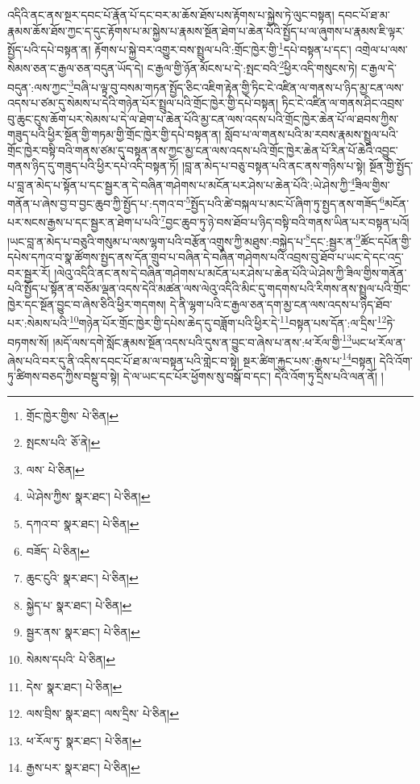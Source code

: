 འདིའི་ནང་ནས་སྔར་དབང་པོ་རྣོན་པོ་དང་བར་མ་ཆོས་ཐོས་པས་རྟོགས་པ་སྐྱེས་ཏེ་ལུང་བསྟན། དབང་པོ་ཐ་མ་རྣམས་ཆོས་ཐོས་ཀྱང་ད་དུང་རྟོགས་པ་མ་སྐྱེས་པ་རྣམས་སྔོན་ཐེག་པ་ཆེན་པོའི་སྤྱོད་པ་ལ་ཞུགས་པ་རྣམས་ཇི་ལྟར་སྤྱོད་པའི་དཔེ་བསྟན་ན། རྟོགས་པ་སྐྱེ་བར་འགྱུར་བས་སྤྲུལ་པའི་:གྲོང་ཁྱེར་གྱི་\footnote{གྲོང་ཁྱེར་གྱིས་  པེ་ཅིན། }དཔེ་བསྟན་པ་དང་། འགྲེལ་པ་ལས་སེམས་ཅན་ང་རྒྱལ་ཅན་བདུན་ཡོད་དེ། ང་རྒྱལ་གྱི་ཉོན་མོངས་པ་དེ་:སྤང་བའི་\footnote{སྤངས་པའི་  ཅོ་ནེ། }ཕྱིར་འདི་གསུངས་ཏེ། ང་རྒྱལ་དེ་བདུན་:ལས་ཀྱང་\footnote{ལས་  པེ་ཅིན། }བཞི་པ་ལྟ་བུ་བསམ་གཏན་སྤྱོད་ཅིང་འཇིག་རྟེན་གྱི་ཏིང་ངེ་འཛིན་ལ་གནས་པ་ཉིད་མྱ་ངན་ལས་འདས་པ་ཙམ་དུ་སེམས་པ་དེའི་གཉེན་པོར་སྤྲུལ་པའི་གྲོང་ཁྱེར་གྱི་དཔེ་བསྟན། ཏིང་ངེ་འཛིན་ལ་གནས་ཤིང་འབྲས་བུ་ཆུང་ངུས་ཆོག་པར་སེམས་པ་དེ་ལ་ཐེག་པ་ཆེན་པོའི་མྱ་ངན་ལས་འདས་པའི་གྲོང་ཁྱེར་ཆེན་པོ་ལ་ཐབས་ཀྱིས་གཟུད་པའི་ཕྱིར་སྔོན་གྱི་གཏམ་གྱི་གྲོང་ཁྱེར་གྱི་དཔེ་བསྟན་ན། སློབ་པ་ལ་གནས་པའི་མ་རབས་རྣམས་སྤྲུལ་པའི་གྲོང་ཁྱེར་བསྟི་བའི་གནས་ཙམ་དུ་བསྟན་ནས་ཀྱང་མྱ་ངན་ལས་འདས་པའི་གྲོང་ཁྱེར་ཆེན་པོ་རིན་པོ་ཆེའི་འབྱུང་གནས་ཉིད་དུ་གཟུད་པའི་ཕྱིར་དཔེ་འདི་བསྟན་ཏོ། །བླ་ན་མེད་པ་བཅུ་བསྟན་པའི་ནང་ནས་གཉིས་པ་སྟེ། སྔོན་གྱི་སྤྱོད་པ་བླ་ན་མེད་པ་སྟོན་པ་དང་སྦྱར་ན་དེ་བཞིན་གཤེགས་པ་མངོན་པར་ཤེས་པ་ཆེན་པོའི་:ཡེ་ཤེས་ཀྱི་\footnote{ཡེ་ཤེས་ཀྱིས་  སྣར་ཐང་།  པེ་ཅིན། }ཟིལ་གྱིས་གནོན་པ་ཞེས་བྱ་བ་བྱང་ཆུབ་ཀྱི་སྤྱོད་པ་:དགའ་བ་\footnote{དཀའ་བ་  སྣར་ཐང་།  པེ་ཅིན། }སྤྱོད་པའི་ཚེ་བསྐལ་པ་མང་པོ་ཞིག་ཏུ་སྤྱད་ནས་གཟོད་\footnote{བཟོད་  པེ་ཅིན། }མངོན་པར་སངས་རྒྱས་པ་དང་སྦྱར་ན་ཐེག་པ་པའི་\footnote{ཆུང་ངུའི་  སྣར་ཐང་།  པེ་ཅིན། }བྱང་ཆུབ་ཏུ་ཉེ་བས་ཐོབ་པ་ཉིད་བསྟི་བའི་གནས་ཡིན་པར་བསྟན་པའོ། །ཡང་བླ་ན་མེད་པ་བཅུའི་གསུམ་པ་ལས་ལྷག་པའི་བརྩོན་འགྲུས་ཀྱི་མཐུས་:བསྐྱེད་པ་\footnote{སྐྱེད་པ་  སྣར་ཐང་།  པེ་ཅིན། }དང་:སྦྱར་ན་\footnote{སྦྱར་ནས་  སྣར་ཐང་།  པེ་ཅིན། }ཚོང་དཔོན་གྱི་དཔེས་དཀའ་བ་སྣ་ཚོགས་སྤྱད་ནས་དོན་གྲུབ་པ་བཞིན་དེ་བཞིན་གཤེགས་པའི་འབྲས་བུ་ཐོབ་པ་ཡང་དེ་དང་འདྲ་བར་སྦྱར་རོ། །ལེའུ་འདིའི་ནང་ནས་དེ་བཞིན་གཤེགས་པ་མངོན་པར་ཤེས་པ་ཆེན་པོའི་ཡེ་ཤེས་ཀྱི་ཟིལ་གྱིས་གནོན་པའི་སྤྱོད་པ་སྟོན་ན་བཅོམ་ལྡན་འདས་དེའི་མཚན་ལས་ལེའུ་འདིའི་མིང་དུ་གདགས་པའི་རིགས་ནས་སྤྲུལ་པའི་གྲོང་ཁྱེར་དང་སྔོན་བྱུང་བ་ཞེས་ཅིའི་ཕྱིར་གདགས། དེ་ནི་ལྷག་པའི་ང་རྒྱལ་ཅན་དག་མྱ་ངན་ལས་འདས་པ་ཉིད་ཐོབ་པར་:སེམས་པའི་\footnote{སེམས་དཔའི་  པེ་ཅིན། }གཉེན་པོར་གྲོང་ཁྱེར་གྱི་དཔེས་ཆེད་དུ་བཟློག་པའི་ཕྱིར་དེ་\footnote{དེས་  སྣར་ཐང་།  པེ་ཅིན། }བསྟན་པས་དོན་:ལ་དྲིས་\footnote{ལས་བྲིས་  སྣར་ཐང་། ལས་དྲིས་  པེ་ཅིན། }ཏེ་བཏགས་སོ། །མདོ་ལས་དགེ་སློང་རྣམས་སྔོན་འདས་པའི་དུས་ན་བྱུང་བ་ཞེས་པ་ནས་:ཕ་རོལ་གྱི་\footnote{ཕ་རོལ་ཏུ་  སྣར་ཐང་།  པེ་ཅིན། }ཡང་ཕ་རོལ་ན་ཞེས་པའི་བར་དུ་ནི་འདིས་དབང་པོ་ཐ་མ་ལ་བསྟན་པའི་གླེང་བ་སྟེ། སྔར་ཚིག་རྐྱང་པས་:རྒྱས་པ་\footnote{རྒྱས་པར་  སྣར་ཐང་།  པེ་ཅིན། }བསྟན། དེའི་འོག་ཏུ་ཚིགས་བཅད་ཀྱིས་བསྡུ་བ་སྟེ། དེ་ལ་ཡང་དང་པོར་ཕྱོགས་སུ་བསྒོ་བ་དང་། དེའི་འོག་ཏུ་དྲིས་པའི་ལན་ནོ། །
